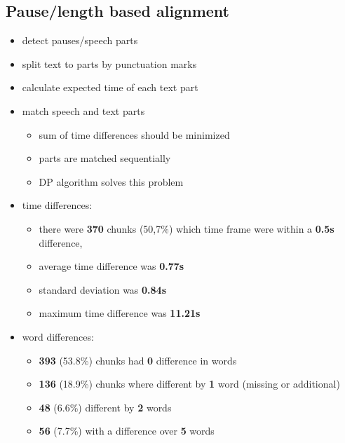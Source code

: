 \documentclass[]{beamer}
\begin{document}
\subsection{Pause/length based alignment}
\begin{frame}
    \begin{itemize}
        \item detect pauses/speech parts
        \item split text to parts by punctuation marks
        \item calculate expected time of each text part
        \item match speech and text parts
        \begin{itemize}
            \item sum of time differences should be minimized
            \item parts are matched sequentially
            \item DP algorithm solves this problem
        \end{itemize}
    \end{itemize}
\end{frame}
\begin{frame}
    \begin{itemize}
        \item time differences:
        \begin{itemize}
            \item there were \textbf{370} chunks (50,7\%) which time frame were within a \textbf{0.5s} difference, 
            \item average time difference was \textbf{0.77s}
            \item standard deviation was \textbf{0.84s}
            \item maximum time difference was \textbf{11.21s}
        \end{itemize}
        \item word differences:
        \begin{itemize}
            \item \textbf{393} (53.8\%) chunks had \textbf{0} difference in words
            \item \textbf{136} (18.9\%) chunks where different by \textbf{1} word (missing or additional)
            \item \textbf{48} (6.6\%) different by \textbf{2} words
            \item \textbf{56} (7.7\%) with a difference over \textbf{5} words
        \end{itemize}
    \end{itemize}
\end{frame}
\end{document}
